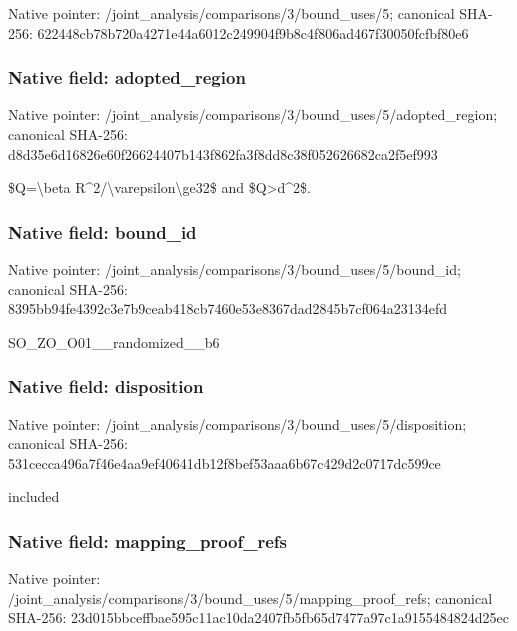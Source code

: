 \documentclass[10pt,a4paper]{article}
\begin{document}
Native pointer: /joint\_analysis/comparis\allowbreak{}ons/3/bound\_uses/5; canonical SHA-256: 622448cb78b720a4271e44a6\allowbreak{}012c249904f9b8c4f806ad46\allowbreak{}7f30050fcfbf80e6



\subsubsection{Native field: adopted\_region}


Native pointer: /joint\_analysis/comparis\allowbreak{}ons/3/bound\_uses/5/adopt\allowbreak{}ed\_region; canonical SHA-256: d8d35e6d16826e60f2662440\allowbreak{}7b143f862fa3f8dd8c38f052\allowbreak{}626682ca2f5ef993


\$Q=\textbackslash{}beta R\textasciicircum{}2/\textbackslash{}varepsilon\textbackslash{}ge32\$ and \$Q>d\textasciicircum{}2\$.


\subsubsection{Native field: bound\_id}


Native pointer: /joint\_analysis/comparis\allowbreak{}ons/3/bound\_uses/5/bound\allowbreak{}\_id; canonical SHA-256: 8395bb94fe4392c3e7b9ceab\allowbreak{}418cb7460e53e8367dad2845\allowbreak{}b7cf064a23134efd


SO\_ZO\_O01\_\_randomized\_\_b6


\subsubsection{Native field: disposition}


Native pointer: /joint\_analysis/comparis\allowbreak{}ons/3/bound\_uses/5/dispo\allowbreak{}sition; canonical SHA-256: 531cecca496a7f46e4aa9ef4\allowbreak{}0641db12f8bef53aaa6b67c4\allowbreak{}29d2c0717dc599ce


included


\subsubsection{Native field: mapping\_proof\_refs}


Native pointer: /joint\_analysis/comparis\allowbreak{}ons/3/bound\_uses/5/mappi\allowbreak{}ng\_proof\_refs; canonical SHA-256: 23d015bbceffbae595c11ac1\allowbreak{}0da2407fb5fb65d7477a97c1\allowbreak{}a9155484824d25ec
\end{document}
